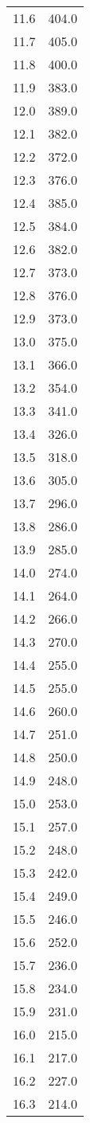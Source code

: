 \begin{table}
\begin{minipage}{0.5\textwidth}
\begin{tabular}{c c}
11.6		&404.0\\
11.7		&405.0\\
11.8		&400.0\\
11.9		&383.0\\
12.0		&389.0\\
12.1		&382.0\\
12.2		&372.0\\
12.3		&376.0\\
12.4		&385.0\\
12.5		&384.0\\
12.6		&382.0\\
12.7		&373.0\\
12.8		&376.0\\
12.9		&373.0\\
13.0		&375.0\\
13.1		&366.0\\
13.2		&354.0\\
13.3		&341.0\\
13.4		&326.0\\
13.5		&318.0\\
13.6		&305.0\\
13.7		&296.0\\
13.8		&286.0\\
13.9		&285.0\\
14.0		&274.0\\
14.1		&264.0\\
14.2		&266.0\\
14.3		&270.0\\
14.4		&255.0\\
14.5		&255.0\\
14.6		&260.0\\
14.7		&251.0\\
14.8		&250.0\\
14.9		&248.0\\
15.0		&253.0\\
15.1		&257.0\\
15.2		&248.0\\
15.3		&242.0\\
15.4		&249.0\\
15.5		&246.0\\
15.6		&252.0\\
15.7		&236.0\\
15.8		&234.0\\
15.9		&231.0\\
16.0		&215.0\\
16.1		&217.0\\
16.2		&227.0\\
16.3		&214.0\\

\end{tabular}
\end{minipage}
\end{table}
